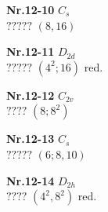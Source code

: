 \documentclass[12pt]{article}
\begin{document}
{\begin{minipage}[t]{3.5cm}
\end{minipage}
\setlength{\unitlength}{1cm}
\begin{minipage}[t]{3.5cm}
\centering
\epsfxsize=2.5cm
\par
{{\bf Nr.12-10} \quad $C_{s}$\\ $?????$ \quad $(8,16)$\\\vspace{3mm} }
\end{minipage}
\setlength{\unitlength}{1cm}
\begin{minipage}[t]{3.5cm}
\centering
\epsfxsize=2.5cm
\par
{{\bf Nr.12-11} \quad $D_{2d}$\\ $?????$ \quad $(4^2;16)$ red.\\\vspace{3mm} }
\end{minipage}
\setlength{\unitlength}{1cm}
\begin{minipage}[t]{3.5cm}
\centering
\epsfxsize=2.5cm
\par
{{\bf Nr.12-12} \quad $C_{2v}$\\ $????$ \quad $(8;8^2)$\\\vspace{3mm} }
\end{minipage}
\setlength{\unitlength}{1cm}
\begin{minipage}[t]{3.5cm}
\centering
\epsfxsize=2.5cm
\par
{{\bf Nr.12-13} \quad $C_{s}$\\ $?????$ \quad $(6;8,10)$\\\vspace{3mm} }
\end{minipage}
\setlength{\unitlength}{1cm}
\begin{minipage}[t]{3.5cm}
\centering
\epsfxsize=2.5cm
\par
{{\bf Nr.12-14} \quad $D_{2h}$\\ $????$ \quad $(4^2,8^2)$ red.\\\vspace{3mm} }
\end{minipage}
}
\end{document}
